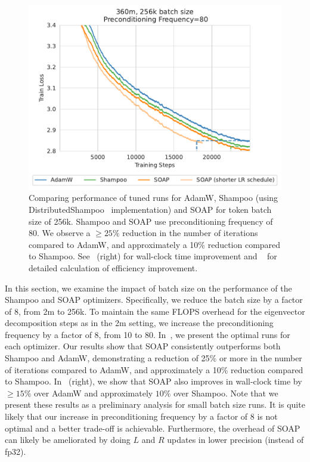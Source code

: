 \documentclass{article} %
\begin{document}
\begin{figure}[!h]
	\centering
	\includegraphics[width=0.7\linewidth]{figures/smallbsz_steps.pdf}
	\caption{Comparing performance of tuned runs for AdamW, Shampoo (using DistributedShampoo~\citep{distributedshampoo} implementation) and SOAP for token batch size of 256k. Shampoo and SOAP use preconditioning frequency of 80. We observe a $\geq 25\%$ reduction in the number of iterations compared to AdamW, and approximately a 10\% reduction compared to Shampoo. See~ (right) for wall-clock time improvement and ~ for detailed calculation of efficiency improvement.}
	\label{fig:smallbsz}
\end{figure}

In this section, we examine the impact of batch size on the performance of the Shampoo and SOAP optimizers. Specifically, we reduce the batch size by a factor of 8, from 2m to 256k. To maintain the same FLOPS overhead for the eigenvector decomposition steps as in the 2m setting, we increase the preconditioning frequency by a factor of 8, from 10 to 80. In~, we present the optimal runs for each optimizer. Our results show that SOAP consistently outperforms both Shampoo and AdamW, demonstrating a reduction of 25\% or more in the number of iterations compared to AdamW, and approximately a 10\% reduction compared to Shampoo. In~ (right), we show that SOAP also improves in wall-clock time by $\geq 15\%$ over AdamW and approximately $10\%$ over Shampoo. Note that we present these results as a preliminary analysis for small batch size runs. It is quite likely that our increase in preconditioning frequency by a factor of 8 is not optimal and a better trade-off is achievable. Furthermore, the overhead of SOAP can likely be ameliorated by doing $L$ and $R$ updates in lower precision (instead of fp32).  
\end{document}
